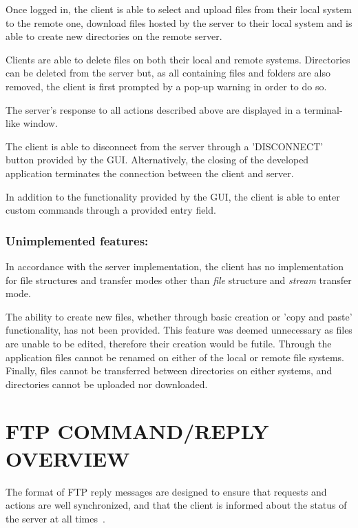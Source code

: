 \documentclass[10pt,twocolumn]{witseiepaper}
\begin{document}
Once logged in, the client is able to select and upload files from their local system to the remote one, download files hosted by the server to their local system and is able to create new directories on the remote server.

Clients are able to delete files on both their local and remote systems. Directories can be deleted from the server but, as all containing files and folders are also removed, the client is first prompted by a pop-up warning in order to do so.

The server's response to all actions described above are displayed in a terminal-like window. 

The client is able to disconnect from the server through a 'DISCONNECT' button provided by the GUI. Alternatively, the closing of the developed application terminates the connection between the client and server.

In addition to the functionality provided by the GUI, the client is able to enter custom commands through a provided entry field. 


\vspace*{-\baselineskip}
\subsubsection*{Unimplemented features: } 
In accordance with the server implementation, the client has no implementation for file structures and transfer modes other than \textit{file} structure and \textit{stream} transfer mode.

The ability to create new files, whether through basic creation or 'copy and paste' functionality, has not been provided. This feature was deemed unnecessary as files are unable to be edited, therefore their creation would be futile. Through the application files cannot be renamed on either of the local or remote file systems. Finally, files cannot be transferred between directories on either systems, and directories cannot be uploaded nor downloaded.


\section{FTP COMMAND/REPLY OVERVIEW}\label{sec:command/reply}

The format of FTP reply messages are designed to ensure that requests and actions are well synchronized, and that the client is informed about the status of the server at all times~\cite{rfc959}. 
\end{document}
